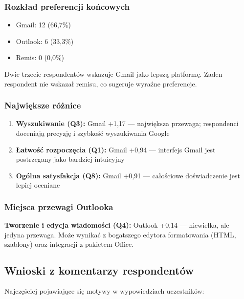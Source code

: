 \documentclass[12pt,a4paper]{article}
\begin{document}
\subsubsection{Rozkład preferencji końcowych}

\begin{itemize}[noitemsep]
    \item Gmail: 12 (66,7\%)
    \item Outlook: 6 (33,3\%)
    \item Remis: 0 (0,0\%)
\end{itemize}

Dwie trzecie respondentów wskazuje Gmail jako lepszą platformę. Żaden respondent nie wskazał remisu, co sugeruje wyraźne preferencje.

\subsubsection{Największe różnice}

\begin{enumerate}[noitemsep]
    \item \textbf{Wyszukiwanie (Q3):} Gmail +1,17 --- największa przewaga; respondenci doceniają precyzję i szybkość wyszukiwania Google
    \item \textbf{Łatwość rozpoczęcia (Q1):} Gmail +0,94 --- interfejs Gmail jest postrzegany jako bardziej intuicyjny
    \item \textbf{Ogólna satysfakcja (Q8):} Gmail +0,91 --- całościowe doświadczenie jest lepiej oceniane
\end{enumerate}

\subsubsection{Miejsca przewagi Outlooka}

\textbf{Tworzenie i edycja wiadomości (Q4):} Outlook +0,14 --- niewielka, ale jedyna przewaga. Może wynikać z bogatszego edytora formatowania (HTML, szablony) oraz integracji z pakietem Office.

\subsection{Wnioski z komentarzy respondentów}

Najczęściej pojawiające się motywy w wypowiedziach uczestników:
\end{document}
